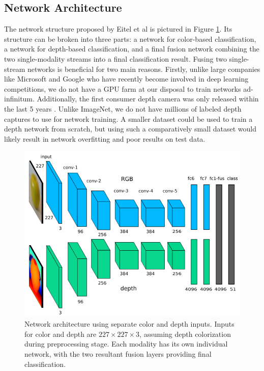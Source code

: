 \subsection{Network Architecture}
The network structure proposed by Eitel et al \cite{Eitel2015} is pictured in Figure \ref{fig:network}. Its structure can be broken into three parts: a network for color-based classification, a network for depth-based classification, and a final fusion network combining the two single-modality streams into a final classification result. Fusing two single-stream networks is beneficial for two main reasons. Firstly, unlike large companies like Microsoft and Google who have recently become involved in deep learning competitions, we do not have a GPU farm at our disposal to train networks ad-infinitum. Additionally, the first consumer depth camera was only released within the last 5 years \cite{Alex2009_kinect}. Unlike ImageNet, we do not have millions of labeled depth captures to use for network training. A smaller dataset could be used to train a depth network from scratch, but using such a comparatively small dataset would likely result in network overfitting and poor results on test data.

\begin{figure}
	\centering
	\includegraphics[width=0.85\linewidth]{img/architecture.png} 
	\caption{Network architecture using separate color and depth inputs. Inputs for color and depth are $227 \times 227 \times 3$, assuming depth colorization during preprocessing stage. Each modality has its own individual network, with the two resultant fusion layers providing final classification.}
	\label{fig:network}
\end{figure}


